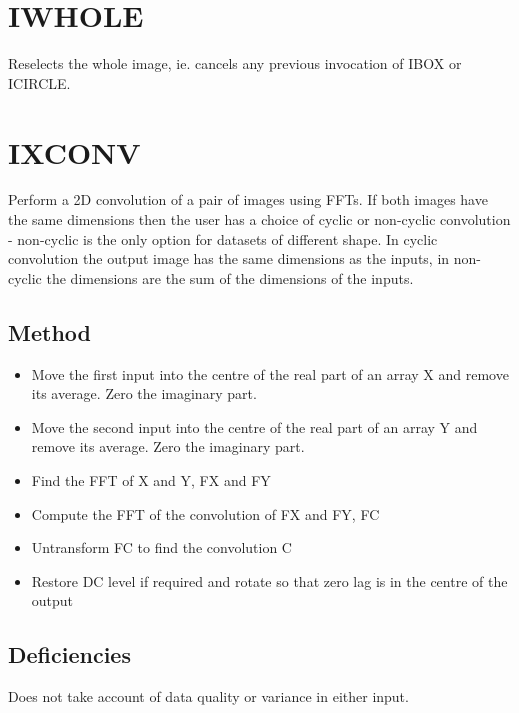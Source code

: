 \documentclass{book}
\renewcommand{\_}{{\tt\char'137}}     %
\begin{document}
\section{IWHOLE}
Reselects the whole image, ie. cancels any previous invocation of
IBOX or ICIRCLE.
 
\section{IXCONV}
Perform a 2D convolution of a pair of images using FFTs. If both
images have the same dimensions then the user has a choice of
cyclic or non-cyclic convolution - non-cyclic is the only option
for datasets of different shape. In cyclic convolution the output
image has the same dimensions as the inputs, in non-cyclic the
dimensions are the sum of the dimensions of the inputs.
 
\subsection{Method}
\begin{itemize}
\item Move the first input into the centre of the real part of an array X
and remove its average. Zero the imaginary part.
\item Move the second input into the centre of the real part of an array Y
and remove its average. Zero the imaginary part.
\item Find the FFT of X and Y, FX and FY
\item Compute the FFT of the convolution of FX and FY, FC
\item Untransform FC to find the convolution C
\item Restore DC level if required and rotate so that zero lag is in the
centre of the output
\end{itemize}
\subsection{Deficiencies}
Does not take account of data quality or variance in either input.
 
\end{document}
